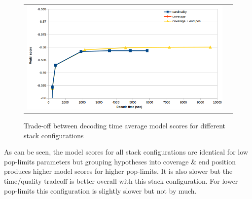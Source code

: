 \documentclass[11pt]{article}
\begin{document}
\begin{figure}[h]
\centering
\begin{tabular}{cc}
{\includegraphics[scale=0.4]{stack-configuration.png}} 
\end{tabular}
\caption{Trade-off between decoding time average model scores for different stack configurations}
\label{fig:stack-configuration}
\end{figure} 
As can be seen, the model scores for all stack configurations are identical for low pop-limits parameters but grouping hypotheses into coverage \& end position produces higher model scores for higher pop-limits. It is also slower but the time/quality tradeoff is better overall with this stack configuration. For lower pop-limits this configuration is slightly slower but not by much. %
\end{document}
